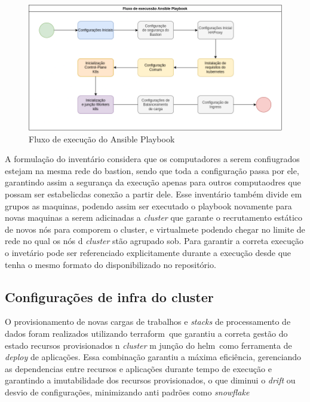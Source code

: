 \begin{figure}[!ht]
    \centering
    \includegraphics[width=\linewidth]{04-figuras/ansibleflow.png}
    \caption{Fluxo de execução do Ansible Playbook}
    \label{fig:ansibleflow}
\end{figure}

A formulação do inventário considera que os computadores a serem confiugrados estejam na mesma rede do bastion, sendo que toda a configuração passa por ele, garantindo assim a segurança da execução apenas para outros computaodres que possam ser estabelicdas conexão a partir dele. Esse inventário também divide em grupos as maquinas, podendo assim ser executado o playbook novamente para novas maquinas a serem adicinadas a \emph{cluster}  que garante o recrutamento estático de novos nós para comporem o cluster, e virtualmete podendo chegar no limite de rede no qual os nós d \emph{cluster} stão agrupado sob. Para garantir a correta execução o invetário pode ser referenciado explicitamente durante a execução desde que tenha o mesmo formato do disponibilizado no repositório.

\subsection{Configurações de infra do cluster}
O provisionamento de novas cargas de trabalhos e \emph{stacks} de processamento de dados foram realizados utilizando terraform\textregistered \ que garantiu a correta gestão do estado recursos provisionados n \emph{cluster} m junção do helm\textregistered \ como ferramenta de \emph{deploy} de aplicações. Essa combinação garantiu a máxima eficiência, gerenciando as dependencias entre recursos e aplicações durante tempo de execução e garantindo a imutabilidade dos recursos provisionados, o que diminui o \emph{drift} ou desvio de configurações, minimizando anti padrões como \emph{snowflake}\cite{snowflakeanti}

